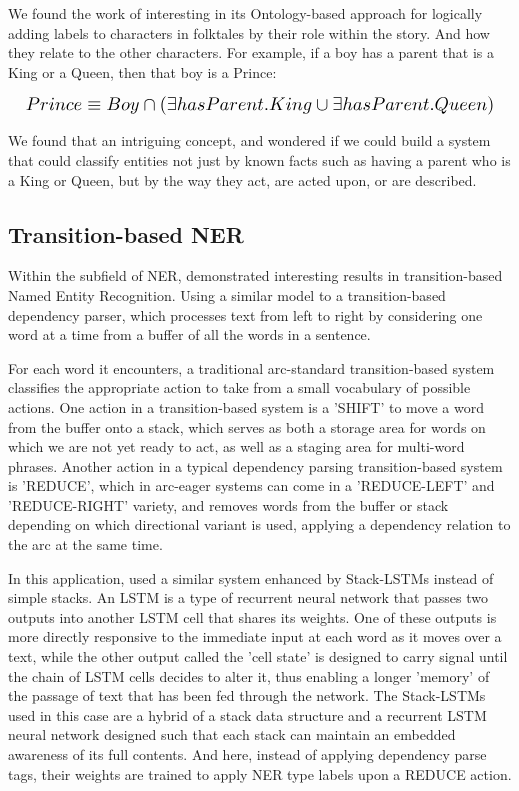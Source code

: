 \documentclass[11pt,a4paper]{article}
\begin{document}
We found the work of \citet{SuciuInterleavingontologybasedreasoning2014} interesting in its Ontology-based approach for logically adding labels to characters in folktales by their role within the story. And how they relate to the other characters. For example, if a boy has a parent that is a King or a Queen, then that boy is a Prince:

\begin{equation}
\resizebox{\linewidth}{!} 
  {
    $ Prince \equiv Boy \cap (\exists hasParent.King \cup \exists hasParent.Queen) $
  }
\end{equation}

We found that an intriguing concept, and wondered if we could build a system that could classify entities not just by known facts such as having a parent who is a King or Queen, but by the way they act, are acted upon, or are described.

\subsection{Transition-based NER}

Within the subfield of NER, \citet{LampleNeuralArchitecturesNamed2016} demonstrated interesting results in transition-based Named Entity Recognition. Using a similar model to a transition-based dependency parser, which processes text from left to right by considering one word at a time from a buffer of all the words in a sentence.

For each word it encounters, a traditional arc-standard transition-based system \cite{NivreIncrementalityDeterministicDependency2004} classifies the appropriate action to take from a small vocabulary of possible actions. One action in a transition-based system is a 'SHIFT' to move a word from the buffer onto a stack, which serves as both a storage area for words on which we are not yet ready to act, as well as a staging area for multi-word phrases. Another action in a typical dependency parsing transition-based system is 'REDUCE', which in arc-eager systems can come in a 'REDUCE-LEFT' and 'REDUCE-RIGHT' variety, and removes words from the buffer or stack depending on which directional variant is used, applying a dependency relation to the arc at the same time.

In this application, \citet{LampleNeuralArchitecturesNamed2016} used a similar system enhanced by Stack-LSTMs\cite{DyerTransitionBasedDependencyParsing2015} instead of simple stacks. An LSTM is a type of recurrent neural network that passes two outputs into another LSTM cell that shares its weights. One of these outputs is more directly responsive to the immediate input at each word as it moves over a text, while the other output called the 'cell state' is designed to carry signal until the chain of LSTM cells decides to alter it, thus enabling a longer 'memory' of the passage of text that has been fed through the network. The Stack-LSTMs used in this case are a hybrid of a stack data structure and a recurrent LSTM neural network designed such that each stack can maintain an embedded awareness of its full contents. And here, instead of applying dependency parse tags, their weights are trained to apply NER type labels upon a REDUCE action.
\end{document}
